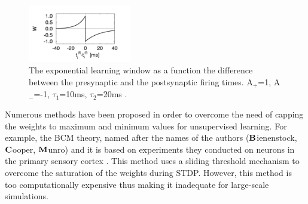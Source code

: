 \begin{figure}[h!]
\centering
\centering
\includegraphics[width=0.4\textwidth]{chapter2/stdpdw.png}
	\caption{ The exponential learning window as a function the difference between the presynaptic and the postsynaptic firing times. A$_{+}$=1, A$_{-}$=-1, $\tau_{1}$=10ms, $\tau_{2}$=20ms \cite{gernstbook}. }
	\label{dw1}
\end{figure}

Numerous methods have been proposed in order to overcome the need of capping the weights to maximum and minimum values for unsupervised learning. For example, the BCM theory, named after the names of the authors ($\bf B$ienenstock, $\bf C$ooper, $\bf M$unro) and it is based on experiments they conducted on neurons in the primary sensory cortex \cite{Bienenstock}. This method uses a sliding threshold mechanism to overcome the saturation of the weights during STDP. However, this method is too computationally expensive thus making it inadequate for large-scale simulations.

